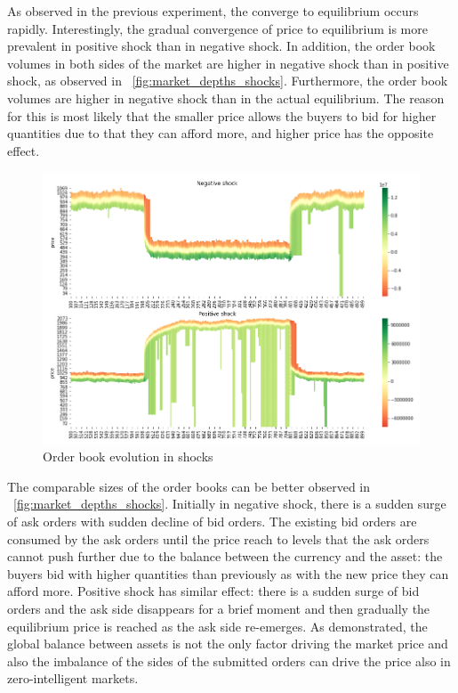 As observed in the previous experiment, the converge to equilibrium occurs rapidly. Interestingly, the gradual convergence of price
to equilibrium is more prevalent in positive shock than in negative shock. In addition, the order book volumes in both sides of the
market are higher in negative shock than in positive shock, as observed in ~\ref{fig:market_depths_shocks}. Furthermore, the order 
book volumes are higher in negative shock than in the actual equilibrium. The reason for this is most likely that the smaller price 
allows the buyers to bid for higher quantities due to that they can afford more, and higher price has the opposite effect. 

\begin{figure}
    \includegraphics[width=\linewidth]{plots/shocks_order_book_evo.png}
    \caption{Order book evolution in shocks}
    \label{fig:shocks_orderbook}
\end{figure}

The comparable sizes of the order books can be better observed in ~\ref{fig:market_depths_shocks}. Initially in negative shock,
there is a sudden surge of ask orders with sudden decline of bid orders. The existing bid orders are consumed by the ask orders 
until the price reach to levels that the ask orders cannot push further due to the balance between the currency and the asset:
the buyers bid with higher quantities than previously as with the new price they can afford more. Positive shock has similar 
effect: there is a sudden surge of bid orders and the ask side disappears for a brief moment and then gradually the equilibrium
price is reached as the ask side re-emerges. As demonstrated, the global balance between assets is not the only factor driving the 
market price and also the imbalance of the sides of the submitted orders can drive the price also in zero-intelligent markets.


